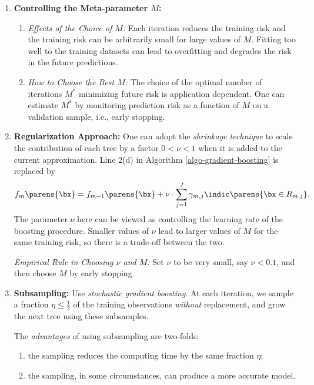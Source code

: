 \documentclass[12pt]{article}
\begin{document}
\begin{enumerate}[label=\textbf{\arabic*.}]

	\item \textbf{Controlling the Meta-parameter $M$:} 
	\begin{enumerate}
		\item \textit{Effects of the Choice of $M$:} Each iteration reduces the training risk and the training risk can be arbitrarily small for large values of $M$. Fitting too well to the training datasets can lead to overfitting and degrades the risk in the future predictions. 
		\item \textit{How to Choose the Best $M$:} The choice of the optimal number of iterations $M^*$ minimizing future risk is application dependent. One can estimate $M^*$ by monitoring prediction risk as a function of $M$ on a validation sample, i.e., early stopping. 
	\end{enumerate}
	
	\item \textbf{Regularization Approach:} One can adopt the \emph{shrinkage technique} to scale the contribution of each tree by a factor $0 < \nu < 1$ when it is added to the current approximation. Line 2(d) in Algorithm \ref{algo-gradient-boosting} is replaced by 
	\begin{align*}
		f_m \parens{\bx} = f_{m-1} \parens{\bx} + \nu \cdot \sum_{j=1}^J \gamma_{m,j} \indic \parens{\bx \in R_{m,j}}. 
	\end{align*}
	The parameter $\nu$ here can be viewed as controlling the learning rate of the boosting procedure. Smaller values of $\nu$ lead to larger values of $M$ for the same training risk, so there is a trade-off between the two. 
	
	\textit{Empirical Rule in Choosing $\nu$ and $M$:} Set $\nu$ to be very small, say $\nu < 0.1$, and then choose $M$ by early stopping. 
	
	\item \textbf{Subsampling:} Use \textit{stochastic gradient boosting}. At each iteration, we sample a fraction $\eta \le \frac{1}{2}$ of the training observations \textit{without} replacement, and grow the next tree using these subsamples. 
	
	The \textit{advantages} of using subsampling are two-folds: 
	\begin{enumerate}
		\item the sampling reduces the computing time by the same fraction $\eta$; 
		\item the sampling, in some circumstances, can produce a more accurate model. 
	\end{enumerate}
	
\end{enumerate}
\end{document}
